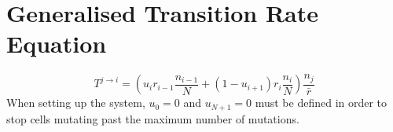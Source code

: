 \documentclass[]{article}
\begin{document}
\section{Generalised Transition Rate Equation}
\begin{equation}
T^{j\rightarrow i} = \left(u_i r_{i-1} \frac{n_{i-1}}{N} + \left(1 - u_{i+1} \right) r_i \frac{n_i}{N} \right) \frac{n_j}{\bar{r}}
\end{equation}
When setting up the system, $u_0 = 0$ and $u_{N+1} = 0$ must be defined in order to stop cells mutating past the maximum number of mutations. 
\end{document}
